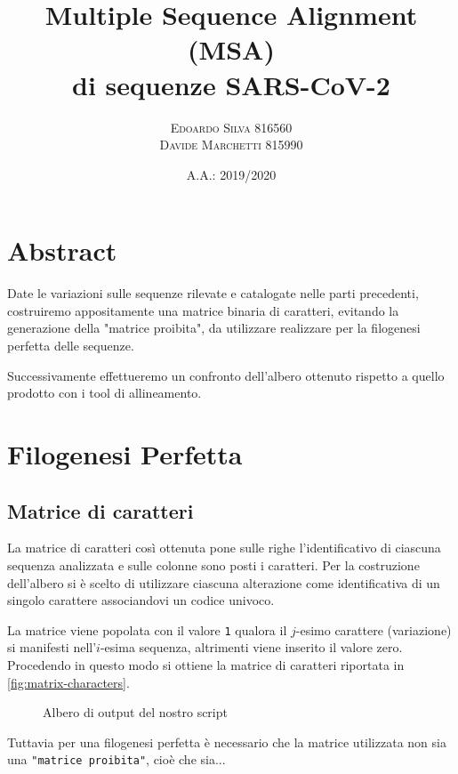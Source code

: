 \documentclass[11pt,italian]{article}
\title{Multiple Sequence Alignment (MSA) \\ di sequenze SARS-CoV-2}
\date{A.A.: 2019/2020}
\author{
    \textsc{Edoardo Silva} 816560 \\
    \textsc{Davide Marchetti} 815990
}
\begin{document}
\maketitle

\section{Abstract}
Date le variazioni sulle sequenze rilevate e catalogate nelle parti precedenti, costruiremo appositamente una matrice binaria di caratteri, evitando la generazione della "matrice proibita", da utilizzare realizzare per la filogenesi perfetta delle sequenze.

Successivamente effettueremo un confronto dell'albero ottenuto rispetto a quello prodotto con i tool di allineamento.

\newpage

\section{Filogenesi Perfetta}

\subsection{Matrice di caratteri}
La matrice di caratteri così ottenuta pone sulle righe l'identificativo di ciascuna sequenza analizzata e sulle colonne sono posti i caratteri. Per la costruzione dell'albero si è scelto di utilizzare ciascuna alterazione come identificativa di un singolo carattere associandovi un codice univoco.

La matrice viene popolata con il valore \lstinline{1} qualora il $j$-esimo carattere (variazione) si manifesti nell'$i$-esima sequenza, altrimenti viene inserito il valore zero. Procedendo in questo modo si ottiene la matrice di caratteri riportata in \cref{fig:matrix-characters}.

\begin{figure}[H]
  \caption{Albero di output del nostro script}
  \label{fig:script-tree}
\end{figure}
\noindent
Tuttavia per una filogenesi perfetta è necessario che la matrice utilizzata non sia una \lstinline{"matrice proibita"}, cioè che sia... %
\end{document}
